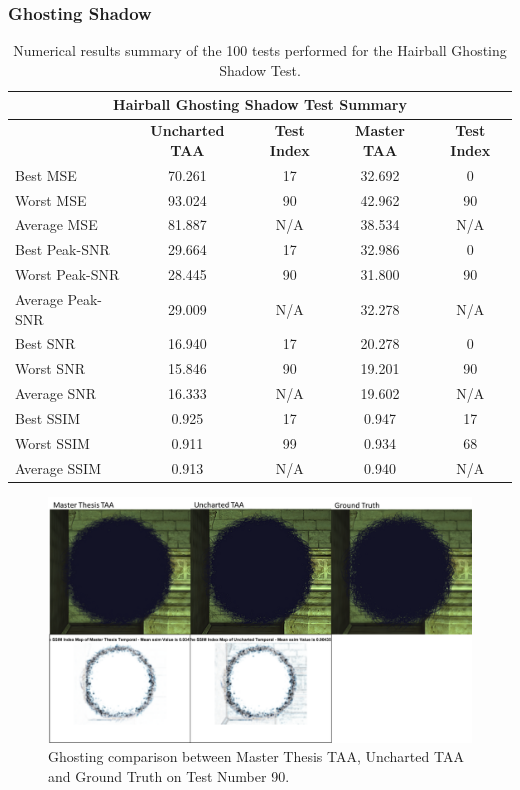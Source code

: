 \documentclass{cslthse-msc}
\begin{document}
\subsubsection{Ghosting Shadow}
\begin{table}[H]
	\small
	\centering
	\caption{Numerical results summary of the 100 tests performed for the Hairball Ghosting Shadow Test.}
	\begin{tabular}{|l|c|c|c|c|}
		\hline
		\multicolumn{5}{|c|}{\textbf{Hairball Ghosting Shadow Test Summary}} \\
		\hline
		\multicolumn{1}{|c|}{\textbf{\diagbox{Tests}{AA}}} & \textbf{Uncharted TAA} & \textbf{Test Index} & \textbf{Master TAA} & \textbf{Test Index} \\
		\hline
	    Best MSE & 70.261 & 17    & 32.692 & 0 \\
		\hline
		Worst MSE & 93.024 & 90    & 42.962 & 90 \\
		\hline
		Average MSE & 81.887 & N/A   & 38.534 & N/A \\
		\hline
		Best Peak-SNR & 29.664 & 17    & 32.986 & 0 \\
		\hline
		Worst Peak-SNR & 28.445 & 90    & 31.800 & 90 \\
		\hline
		Average Peak-SNR  & 29.009 & N/A   & 32.278 & N/A \\
		\hline
		Best SNR & 16.940 & 17    & 20.278 & 0 \\
		\hline
		Worst SNR & 15.846 & 90    & 19.201 & 90 \\
		\hline
		Average SNR  & 16.333 & N/A   & 19.602 & N/A \\
		\hline
		Best SSIM & 0.925 & 17    & 0.947 & 17 \\
		\hline
		Worst SSIM & 0.911 & 99    & 0.934 & 68 \\
		\hline
		Average SSIM & 0.913 & N/A   & 0.940 & N/A \\
		\hline
	\end{tabular}%
	\label{tab:hairball_ghosting_shadow}%
\end{table}%

\begin{figure}[H]
	\centering
	\includegraphics[scale=0.8]{images/results/hairball_ghosting_shadow.png}
	\caption{Ghosting comparison between Master Thesis TAA, Uncharted TAA and Ground Truth on Test Number 90.}\label{fig:hairball_ghosting_shadow}
\end{figure}
\end{document}
